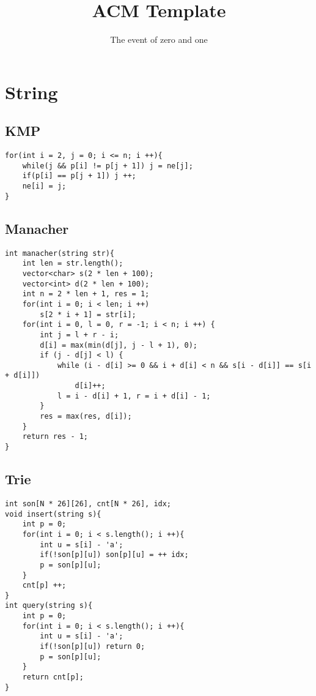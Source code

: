 \documentclass[twocolumn,a4]{article}
\title{\vspace{4cm}\Huge\bfseries ACM Template}
\author{\vspace{2cm}The event of zero and one}
\begin{document}
\begin{titlepage}
\maketitle
\end{titlepage}

\newpage
\pagestyle{empty}
\tableofcontents
\newpage\clearpage
\newpage
\pagestyle{fancy}
\setcounter{page}{1}   %

\section{String}
\subsection{KMP}
\begin{lstlisting}
for(int i = 2, j = 0; i <= n; i ++){
    while(j && p[i] != p[j + 1]) j = ne[j];
    if(p[i] == p[j + 1]) j ++;
    ne[i] = j;
}
\end{lstlisting}

\subsection{Manacher}
\begin{lstlisting}
int manacher(string str){
	int len = str.length();
	vector<char> s(2 * len + 100);
	vector<int> d(2 * len + 100);
	int n = 2 * len + 1, res = 1;
	for(int i = 0; i < len; i ++) 
        s[2 * i + 1] = str[i];
	for(int i = 0, l = 0, r = -1; i < n; i ++) {
		int j = l + r - i;
		d[i] = max(min(d[j], j - l + 1), 0);
		if (j - d[j] < l) {
			while (i - d[i] >= 0 && i + d[i] < n && s[i - d[i]] == s[i + d[i]])
				d[i]++;
			l = i - d[i] + 1, r = i + d[i] - 1;
		}
		res = max(res, d[i]);
	}
	return res - 1;
}
\end{lstlisting}

\subsection{Trie}
\begin{lstlisting}
int son[N * 26][26], cnt[N * 26], idx;
void insert(string s){
    int p = 0;
    for(int i = 0; i < s.length(); i ++){
        int u = s[i] - 'a';
        if(!son[p][u]) son[p][u] = ++ idx;
        p = son[p][u];
    }
    cnt[p] ++;
}
int query(string s){
    int p = 0;
    for(int i = 0; i < s.length(); i ++){
        int u = s[i] - 'a'; 
        if(!son[p][u]) return 0;
        p = son[p][u];
    }
    return cnt[p];
}
\end{lstlisting}
\end{document}
